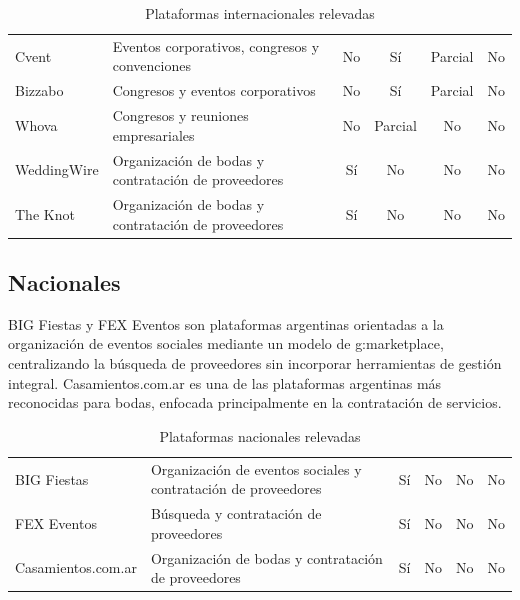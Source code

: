 \begin{table}[H]
    \centering
    \caption{Plataformas internacionales relevadas}
    \label{tab:plataformas-internacionales}
    \small
    \begin{tabularx}{\textwidth}{l L c c c c}
        \toprule
         &  &  &  &  &  \\
        \midrule
        Cvent & Eventos corporativos, congresos y convenciones & No & Sí & Parcial & No \\
        Bizzabo & Congresos y eventos corporativos & No & Sí & Parcial & No \\
        Whova & Congresos y reuniones empresariales & No & Parcial & No & No \\
        WeddingWire & Organización de bodas y contratación de proveedores & Sí & No & No & No \\
        The Knot & Organización de bodas y contratación de proveedores & Sí & No & No & No \\
        \bottomrule
    \end{tabularx}
\end{table}

\subsection{Nacionales}

BIG Fiestas \citep{bigfiestas} y FEX Eventos son plataformas argentinas
orientadas a la organización de eventos sociales mediante un modelo de
\gls{g:marketplace}, centralizando la búsqueda de proveedores sin
incorporar herramientas de gestión integral. Casamientos.com.ar
\citep{casamientos} es una de las plataformas argentinas más reconocidas
para bodas, enfocada principalmente en la contratación de servicios.

\begin{table}[H]
    \centering
    \caption{Plataformas nacionales relevadas}
    \label{tab:plataformas-nacionales}
    \small
    \begin{tabularx}{\textwidth}{l L c c c c}
        \toprule
         &  &  &  &  &  \\
        \midrule
        BIG Fiestas & Organización de eventos sociales y contratación de proveedores & Sí & No & No & No \\
        FEX Eventos & Búsqueda y contratación de proveedores & Sí & No & No & No \\
        Casamientos.com.ar & Organización de bodas y contratación de proveedores & Sí & No & No & No \\
        \bottomrule
    \end{tabularx}
\end{table}

